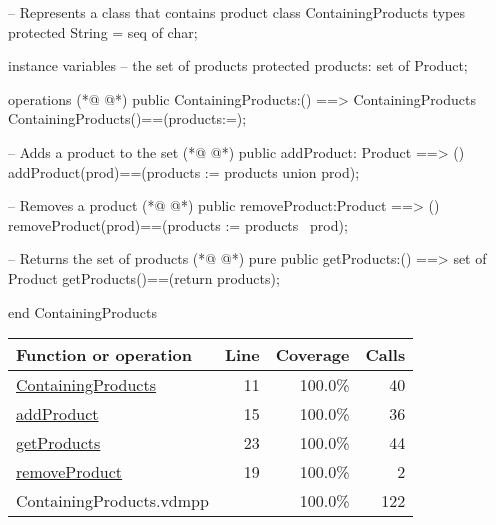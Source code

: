 \begin{vdmpp}[breaklines=true]
-- Represents a class that contains product
class ContainingProducts
 types 
   protected String = seq of char;

 instance variables
  -- the set of products
   protected products: set of Product;
   
 operations
(*@
\label{ContainingProducts:11}
@*)
  public ContainingProducts:() ==> ContainingProducts 
  ContainingProducts()==(products:={});
 
  -- Adds a product to the set
(*@
\label{addProduct:15}
@*)
  public addProduct: Product ==> ()
  addProduct(prod)==(products := products union {prod});
  
  -- Removes a product
(*@
\label{removeProduct:19}
@*)
  public removeProduct:Product ==> () 
  removeProduct(prod)==(products := products \ {prod});
  
  -- Returns the set of products
(*@
\label{getProducts:23}
@*)
  pure public getProducts:() ==> set of Product 
  getProducts()==(return products);

end ContainingProducts
\end{vdmpp}
\bigskip
\begin{longtable}{|l|r|r|r|}
\hline
Function or operation & Line & Coverage & Calls \\
\hline
\hline
\hyperref[ContainingProducts:11]{ContainingProducts} & 11&100.0\% & 40 \\
\hline
\hyperref[addProduct:15]{addProduct} & 15&100.0\% & 36 \\
\hline
\hyperref[getProducts:23]{getProducts} & 23&100.0\% & 44 \\
\hline
\hyperref[removeProduct:19]{removeProduct} & 19&100.0\% & 2 \\
\hline
\hline
ContainingProducts.vdmpp & & 100.0\% & 122 \\
\hline
\end{longtable}

